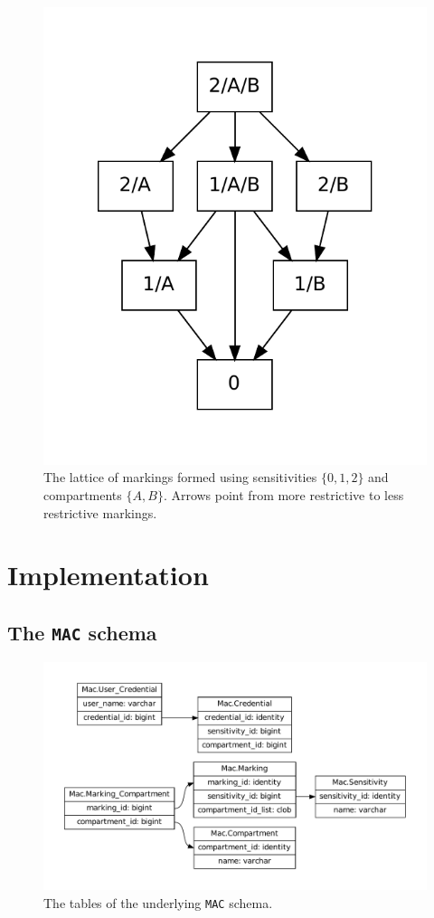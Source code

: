 \documentclass[twocolumn]{article}
\begin{document}
\begin{figure}
  \begin{center}
    \includegraphics[width=0.75\linewidth]{lattice.pdf}
  \end{center}
  \caption{The lattice of markings formed using sensitivities $\{0,1,2\}$ and compartments $\{A,B\}$. Arrows point from more restrictive to less restrictive markings.}
  \label{fig:lattice}
\end{figure}

\section{Implementation}

\subsection{The {\tt MAC} schema}

\begin{figure}
  \begin{center}
    \includegraphics[width=\linewidth]{mac-schema.pdf}
  \end{center}
  \caption{The tables of the underlying {\tt MAC} schema.}
  \label{fig:mac-schema}
\end{figure}
\end{document}
